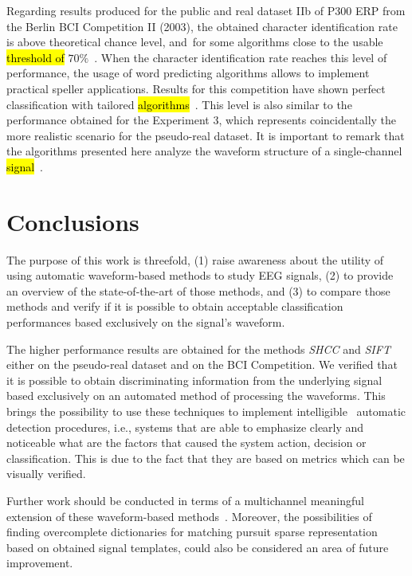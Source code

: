\documentclass[brainsci,article,accept,moreauthors,pdftex,10pt,a4paper]{mdpi}
\begin{document}
Regarding results produced for the public and real dataset IIb of P300 ERP from the Berlin BCI Competition II (2003), the obtained character identification rate is above theoretical chance level, and~for some algorithms close to the usable\hl{ threshold of} $70\%$~\citep{Neuper2003,Kathner2017}.  When the character identification rate reaches this level of performance, the usage of word predicting algorithms allows to implement practical speller applications.  Results for this competition have shown perfect classification with tailored \hl{algorithms}~\citep{Kundu2018}.  This level is also similar to the performance obtained for the Experiment 3, which represents coincidentally the more realistic scenario for the pseudo-real dataset.  It is important to remark that the algorithms presented here analyze the waveform structure of a single-channel \hl{signal}~\citep{Rakotomamonjy2008,Gribonval2008}.  
\section{Conclusions}
\label{section:conclusion}

The purpose of this work is threefold, (1) raise awareness about the utility of using automatic waveform-based methods to study EEG signals, (2) to provide an overview of the state-of-the-art of those methods, and (3) to compare those methods and verify if it is possible to obtain acceptable classification performances based exclusively on the signal's waveform.

The higher performance results are obtained for the methods \textit{SHCC} and \textit{SIFT} either on the pseudo-real dataset and on the BCI Competition.  We verified that it is possible to obtain discriminating information from the underlying signal based exclusively on an automated method of processing the waveforms.  This brings the possibility to use these techniques to implement intelligible~\citep{j2018challenge} automatic detection procedures, i.e., systems that are able to emphasize clearly and noticeable what are the factors that caused the system action, decision or classification.  This is due to the fact that they are based on metrics which can be visually verified.  

Further work should be conducted in terms of a multichannel meaningful extension of these waveform-based methods~\citep{Gribonval2008}. Moreover, the possibilities of finding overcomplete dictionaries for matching pursuit sparse representation based on obtained signal templates, could also be considered an area of future improvement.
\end{document}
